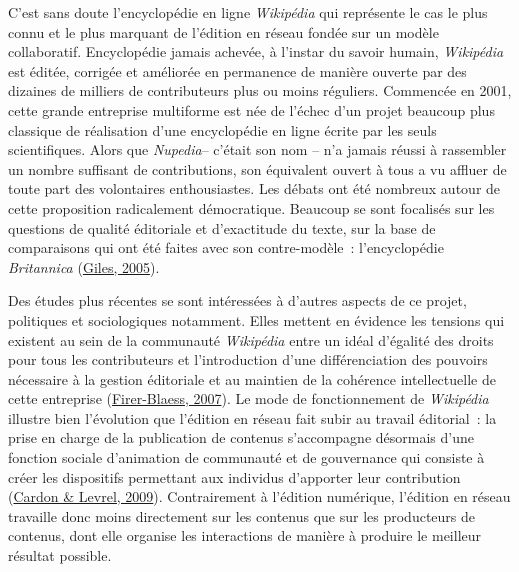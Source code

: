 \documentclass[12pt,french,letterpaper,]{article}
\begin{document}
C'est sans doute l'encyclopédie en ligne \emph{Wikipédia} qui représente
le cas le plus connu et le plus marquant de l'édition en réseau fondée
sur un modèle collaboratif. Encyclopédie jamais achevée, à l'instar du
savoir humain, \emph{Wikipédia} est éditée, corrigée et améliorée en
permanence de manière ouverte par des dizaines de milliers de
contributeurs plus ou moins réguliers. Commencée en 2001, cette grande
entreprise multiforme est née de l'échec d'un projet beaucoup plus
classique de réalisation d'une encyclopédie en ligne écrite par les
seuls scientifiques. Alors que \emph{Nupedia}-- c'était son nom -- n'a
jamais réussi à rassembler un nombre suffisant de contributions, son
équivalent ouvert à tous a vu affluer de toute part des volontaires
enthousiastes. Les débats ont été nombreux autour de cette proposition
radicalement démocratique. Beaucoup se sont focalisés sur les questions
de qualité éditoriale et d'exactitude du texte, sur la base de
comparaisons qui ont été faites avec son contre-modèle~: l'encyclopédie
\emph{Britannica} (\protect\hyperlink{ref-giles_internet_2005}{Giles,
2005}).

Des études plus récentes se sont intéressées à d'autres aspects de ce
projet, politiques et sociologiques notamment. Elles mettent en évidence
les tensions qui existent au sein de la communauté \emph{Wikipédia}
entre un idéal d'égalité des droits pour tous les contributeurs et
l'introduction d'une différenciation des pouvoirs nécessaire à la
gestion éditoriale et au maintien de la cohérence intellectuelle de
cette entreprise
(\protect\hyperlink{ref-firer-blaess_wikipedia_2007}{Firer-Blaess,
2007}). Le mode de fonctionnement de \emph{Wikipédia} illustre bien
l'évolution que l'édition en réseau fait subir au travail éditorial~: la
prise en charge de la publication de contenus s'accompagne désormais
d'une fonction sociale d'animation de communauté et de gouvernance qui
consiste à créer les dispositifs permettant aux individus d'apporter
leur contribution (\protect\hyperlink{ref-cardon_vigilance_2009}{Cardon
\& Levrel, 2009}). Contrairement à l'édition numérique, l'édition en
réseau travaille donc moins directement sur les contenus que sur les
producteurs de contenus, dont elle organise les interactions de manière
à produire le meilleur résultat possible.
\end{document}

